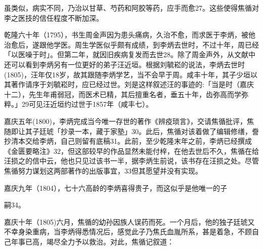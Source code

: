 \noindent 虽类似，病实不同，乃治以甘草、芍药和阿胶等药，应手而愈27。这些使得焦循对李之医技的信任程度不断加深。

乾隆六十年（1795），书生周金声因为患头痛病，久治不愈，而求医于李炳，被他治愈后，遂跟他学医。周生学医似乎颇有成绩，到李炳去世时，不过十年，周已经「以医噪于时」。但第二年，就因旧疾病复发而去世28。除了周金声外，从文献中还可以看到李炳另有一位更好的弟子汪近垣。根据刘毓崧的说法，李炳去世时(1805)，汪年仅18岁，故其跟随李炳学艺，当不会早于周。咸丰十年，其子少垣以其著作请序于刘毓崧时，应已经过世。刘是这样叙述汪的事迹的:「当是时（嘉庆十二），先生年甫弱冠，而医术已精，其后擅重名者，垂五十年，齿弥高而学弥粹。」29可见汪近垣约过世于1857年（咸丰七）。

嘉庆五年(1800)，李炳完成当今唯一存世的著作《辨疫琐言》，交请焦循批评，焦随即让其子廷琥「抄录一本，藏于家塾」30。此后，焦循对该着做了编辑修缮，誊抄清本交给李炳，自己则留有底稿31。此前，至少乾隆末年之前，李炳已经撰成《金匮要略注》32，但这部较早的作品显然未能付梓，在他去世后不久，焦循在给汪损之的信中云，他也只见过该书一半，据李炳生前说，该书存在汪损之处。尽管焦循努力谋划这两部著作的出版事宜，33但其愿望并没有实现。

嘉庆九年（1804），七十六高龄的李炳喜得贵子，而这似乎是他唯一的子

\vfill
\begin{BookNotes}
\end{BookNotes}

\noindent 嗣34。

嘉庆十年（1805)六月，焦循的幼孙因族人误药而死。一个月后，他的独子廷琥又不幸身染重病，当李炳得悉情况后，感觉此子乃焦氏血胤所系，甚是着急，不顾自己年事已高，竭尽全力予以救治。对此，焦循记叙道：

